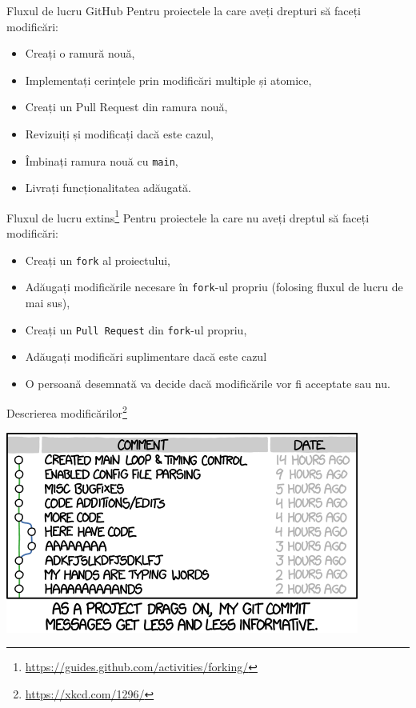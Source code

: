 \documentclass[presentation]{beamer}
\begin{document}
\begin{frame}[label={sec:org8528ceb},fragile]{Fluxul de lucru GitHub}
 Pentru proiectele la care aveți drepturi să faceți modificări:
\begin{itemize}
\item Creați o ramură nouă,
\item Implementați cerințele prin \alert{modificări multiple și atomice},
\item Creați un \alert{Pull Request} din ramura nouă,
\item Revizuiți și modificați dacă este cazul,
\item Îmbinați ramura nouă cu \texttt{main},
\item Livrați funcționalitatea adăugată.
\end{itemize}
\end{frame}
\begin{frame}[label={sec:org1b81611},fragile]{Fluxul de lucru extins\footnote{\url{https://guides.github.com/activities/forking/}}}
 Pentru proiectele la care nu aveți dreptul să faceți modificări:
\begin{itemize}
\item Creați un \texttt{fork} al proiectului,
\item Adăugați modificările necesare în \texttt{fork}-ul propriu (folosing fluxul de lucru de mai sus),
\item Creați un \texttt{Pull Request} din \texttt{fork}-ul propriu,
\item Adăugați modificări suplimentare dacă este cazul
\item O persoană desemnată va decide dacă modificările vor fi acceptate sau nu.
\end{itemize}
\end{frame}
\begin{frame}[label={sec:org7fc7b0b}]{Descrierea modificărilor\footnote{\url{https://xkcd.com/1296/}}}
\begin{center}
\includegraphics[width=.7\textwidth]{img/xkcd-git-commit.png}
\end{center}
\end{frame}
\end{document}

